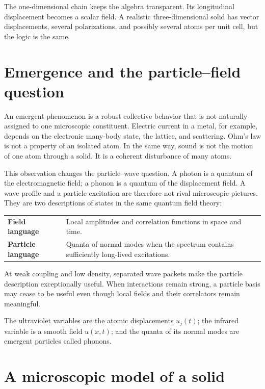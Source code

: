 \documentclass[11pt]{article}
\begin{document}
The one-dimensional chain keeps the algebra transparent.  Its longitudinal
displacement becomes a scalar field.  A realistic three-dimensional solid
has vector displacements, several polarizations, and possibly several atoms
per unit cell, but the logic is the same.

\section{Emergence and the particle--field question}

An emergent phenomenon is a robust collective behavior that is not naturally
assigned to one microscopic constituent.  Electric current in a metal, for
example, depends on the electronic many-body state, the lattice, and
scattering.  Ohm's law is not a property of an isolated atom.  In the same
way, sound is not the motion of one atom through a solid.  It is a coherent
disturbance of many atoms.

This observation changes the particle--wave question.  A photon is a quantum
of the electromagnetic field; a phonon is a quantum of the displacement
field.  A wave profile and a particle excitation are therefore not rival
microscopic pictures.  They are two descriptions of states in the same
quantum field theory:
\begin{center}
\begin{tabular}{>{\bfseries}p{} p{}}
Field language & Local amplitudes and correlation functions in space and
time. \\
Particle language & Quanta of normal modes when the spectrum contains
sufficiently long-lived excitations. \\
\end{tabular}
\end{center}

At weak coupling and low density, separated wave packets make the particle
description exceptionally useful.  When interactions remain strong, a
particle basis may cease to be useful even though local fields and their
correlators remain meaningful.

\begin{keyidea}
The ultraviolet variables are the atomic displacements $u_j(t)$; the
infrared variable is a smooth field $u(x,t)$; and the quanta of its normal
modes are emergent particles called phonons.
\end{keyidea}

\section{A microscopic model of a solid}
\end{document}
